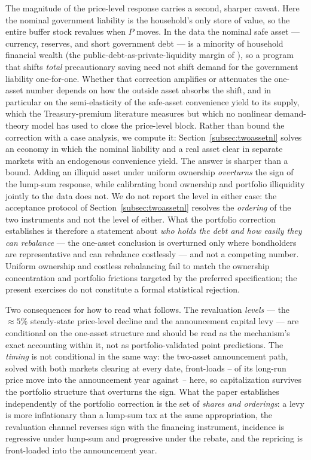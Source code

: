 \documentclass[12pt]{article}
\providecommand{\pendingnum}{\textit{--}}
\providecommand{\TwoTrShare}{\pendingnum}\providecommand{\TwoTrImpQ}{\pendingnum}
\begin{document}
The magnitude of the price-level response carries a second, sharper
caveat. Here the nominal government liability is the household's only store
of value, so the entire buffer stock revalues when $P$ moves. In the data
the nominal safe asset --- currency, reserves, and short government debt ---
is a minority of household financial wealth (the
public-debt-as-private-liquidity margin of \citealp{woodford1990}), so a
program that shifts \emph{total} precautionary saving need not shift demand
for the government liability one-for-one. Whether that correction amplifies
or attenuates the one-asset number depends on how the outside asset absorbs
the shift, and in particular on the semi-elasticity of the safe-asset
convenience yield to its supply, which the Treasury-premium literature
measures \citep{krishnamurthy2012} but which no nonlinear demand-theory
model has used to close the price-level block. Rather than bound the
correction with a case analysis, we compute it:
Section~\ref{subsec:twoassetnl} solves an economy in which the nominal
liability and a real asset clear in separate markets with an endogenous
convenience yield. The answer is sharper than a bound. Adding an illiquid
asset under uniform ownership \emph{overturns} the sign of the lump-sum
response, while calibrating bond ownership and portfolio illiquidity
jointly to the data does not. We do not report the level in either case:
the acceptance protocol of Section~\ref{subsec:twoassetnl} resolves the
\emph{ordering} of the two instruments and not the level of either. What
the portfolio correction establishes is therefore a statement about
\emph{who holds the debt and how easily they can rebalance} --- the
one-asset conclusion is overturned only where bondholders are
representative and can rebalance costlessly --- and not a competing
number. Uniform
ownership and costless rebalancing fail to match the ownership concentration
and portfolio frictions targeted by the preferred specification; the present
exercises do not constitute a formal statistical rejection.

Two consequences for how to read what follows. The revaluation
\emph{levels} --- the $\approx5\%$ steady-state price-level decline and the
announcement capital levy --- are conditional on the one-asset structure and
should be read as the mechanism's exact accounting within it, not as
portfolio-validated point predictions. The \emph{timing} is not conditional
in the same way: the two-asset announcement path, solved with both markets
clearing at every date, front-loads $\TwoTrShare$ of its long-run price
move into the announcement year against $\OneTrShare$ here, so
capitalization survives the portfolio structure that overturns the sign.
What the paper establishes independently of the portfolio correction is the
set of \emph{shares and orderings}: a levy is more
inflationary than a lump-sum tax at the same appropriation, the revaluation channel reverses
sign with the financing instrument, incidence is regressive under lump-sum
and progressive under the rebate, and the repricing is front-loaded into
the announcement year.
\end{document}
